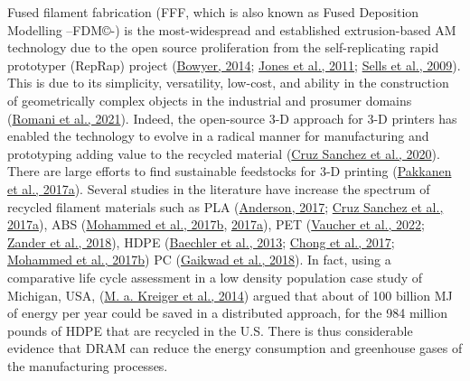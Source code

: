 \documentclass[
  12pt,
  number,
  review]{elsarticle}
\begin{document}
Fused filament fabrication (FFF, which is also known as Fused Deposition
Modelling --FDM©-) is the most-widespread and established
extrusion-based AM technology due to the open source proliferation from
the self-replicating rapid prototyper (RepRap) project
(\protect\hyperlink{ref-bowyer2014}{Bowyer, 2014};
\protect\hyperlink{ref-jones2011}{Jones et al., 2011};
\protect\hyperlink{ref-sells2009}{Sells et al., 2009}). This is due to
its simplicity, versatility, low-cost, and ability in the construction
of geometrically complex objects in the industrial and prosumer domains
(\protect\hyperlink{ref-romani2021}{Romani et al., 2021}). Indeed, the
open-source 3-D approach for 3-D printers has enabled the technology to
evolve in a radical manner for manufacturing and prototyping adding
value to the recycled material
(\protect\hyperlink{ref-cruzsanchez2020}{Cruz Sanchez et al., 2020}).
There are large efforts to find sustainable feedstocks for 3-D printing
(\protect\hyperlink{ref-Pakkanen2017}{Pakkanen et al., 2017a}). Several
studies in the literature have increase the spectrum of recycled
filament materials such as PLA
(\protect\hyperlink{ref-anderson2017}{Anderson, 2017};
\protect\hyperlink{ref-cruzsanchez2017}{Cruz Sanchez et al., 2017a}),
ABS (\protect\hyperlink{ref-mohammed2017a}{Mohammed et al., 2017b},
\protect\hyperlink{ref-mohammed2017}{2017a}), PET
(\protect\hyperlink{ref-vaucher2022}{Vaucher et al., 2022};
\protect\hyperlink{ref-zander2018}{Zander et al., 2018}), HDPE
(\protect\hyperlink{ref-baechler2013}{Baechler et al., 2013};
\protect\hyperlink{ref-chong2017}{Chong et al., 2017};
\protect\hyperlink{ref-mohammed2017a}{Mohammed et al., 2017b}) PC
(\protect\hyperlink{ref-gaikwad2018}{Gaikwad et al., 2018}). In fact,
using a comparative life cycle assessment in a low density population
case study of Michigan, USA, (\protect\hyperlink{ref-Kreiger2014}{M. a.
Kreiger et al., 2014}) argued that about of 100 billion MJ of energy per
year could be saved in a distributed approach, for the 984 million
pounds of HDPE that are recycled in the U.S. There is thus considerable
evidence that DRAM can reduce the energy consumption and greenhouse
gases of the manufacturing processes.
\end{document}
